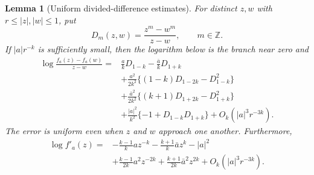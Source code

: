 \documentclass[11pt,a4paper]{article}
\numberwithin{equation}{section}
\newtheorem{lemma}[theorem]{Lemma}
\theoremstyle{definition}
\theoremstyle{remark}
\begin{document}
\begin{lemma}[Uniform divided-difference estimates]
\label{lem:divided-difference-expansion}
For distinct $z,w$ with $r\leq|z|,|w|\leq1$, put
\[
 D_m(z,w)=\frac{z^m-w^m}{z-w},\qquad m\in\mathbb Z.
\]
If $|a|r^{-k}$ is sufficiently small, then the logarithm below is the
branch near zero and
\begin{align}
 \log\frac{f_a(z)-f_a(w)}{z-w}
 ={}&\frac{a}{k}D_{1-k}-\frac{\bar a}{k}D_{1+k}
 \nonumber\\
 &+\frac{a^2}{2k^2}\{(1-k)D_{1-2k}-D_{1-k}^2\}
 \nonumber\\
 &+\frac{\bar a^2}{2k^2}\{(k+1)D_{1+2k}-D_{1+k}^2\}
 \nonumber\\
 &+\frac{|a|^2}{k^2}\{-1+D_{1-k}D_{1+k}\}
 +O_k(|a|^3r^{-3k}).
 \label{eq:pair-expansion}
\end{align}
The error is uniform even when $z$ and $w$ approach one another.
Furthermore,
\begin{align}
 \log f'_a(z)
 ={}&-\frac{k-1}{k}a z^{-k}-\frac{k+1}{k}\bar a z^k
       -|a|^2
 \nonumber\\
 &+\frac{k-1}{2k}a^2z^{-2k}
       +\frac{k+1}{2k}\bar a^2z^{2k}
       +O_k(|a|^3r^{-3k}).
 \label{eq:jacobian-expansion}
\end{align}
\end{lemma}
\end{document}
